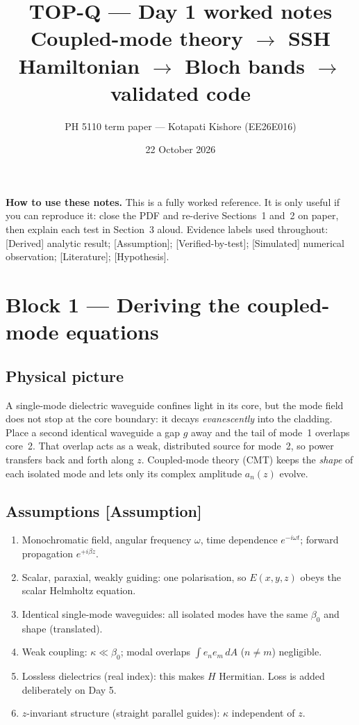 \documentclass[10pt,a4paper]{article}
\title{TOP-Q --- Day 1 worked notes\\[2pt]\large Coupled-mode theory $\to$ SSH Hamiltonian $\to$ Bloch bands $\to$ validated code}
\author{PH 5110 term paper --- Kotapati Kishore (EE26E016)}
\date{22 October 2026}
\newcommand{\note}[1]{\par\smallskip\noindent\colorbox{gray!12}{\parbox{\dimexpr\linewidth-2\fboxsep}{\small #1}}\par\smallskip}
\newcommand{\evd}[1]{\textsf{\small[#1]}}
\begin{document}
\maketitle

\note{\textbf{How to use these notes.} This is a fully worked reference. It is only useful if you can reproduce it:
close the PDF and re-derive Sections~1 and~2 on paper, then explain each test in Section~3 aloud.
Evidence labels used throughout: \evd{Derived} analytic result; \evd{Assumption}; \evd{Verified-by-test};
\evd{Simulated} numerical observation; \evd{Literature}; \evd{Hypothesis}.}

\tableofcontents

\section{Block 1 --- Deriving the coupled-mode equations}
\subsection{Physical picture}
A single-mode dielectric waveguide confines light in its core, but the mode field does not stop at the
core boundary: it decays \emph{evanescently} into the cladding. Place a second identical waveguide a
gap $g$ away and the tail of mode~1 overlaps core~2. That overlap acts as a weak, distributed source for
mode~2, so power transfers back and forth along $z$. Coupled-mode theory (CMT) keeps the
\emph{shape} of each isolated mode and lets only its complex amplitude $a_n(z)$ evolve.

\subsection{Assumptions \evd{Assumption}}
\begin{enumerate}[label=A\arabic*,itemsep=1pt]
\item Monochromatic field, angular frequency $\omega$, time dependence $e^{-i\omega t}$; forward propagation $e^{+i\beta z}$.
\item Scalar, paraxial, weakly guiding: one polarisation, so $E(x,y,z)$ obeys the scalar Helmholtz equation.
\item Identical single-mode waveguides: all isolated modes have the same $\beta_0$ and shape (translated).
\item Weak coupling: $\kappa\ll\beta_0$; modal overlaps $\int e_ne_m\,dA$ ($n\neq m$) negligible.
\item Lossless dielectrics (real index): this makes $H$ Hermitian. Loss is added deliberately on Day 5.
\item $z$-invariant structure (straight parallel guides): $\kappa$ independent of $z$.
\end{enumerate}
\end{document}
